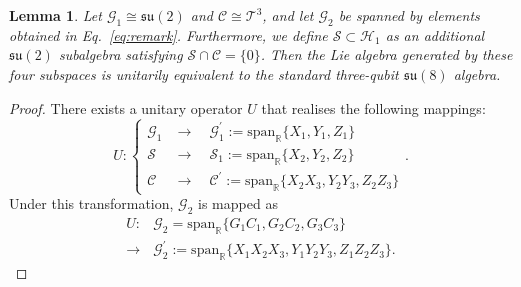 \documentclass[aps,showpacs,amsmath,amssymb,twocolumn,prx,longbibliography,superscriptaddress,notitlepage,floatfix,10pt]{revtex4-2}
\newtheorem{lemma}{Lemma} %
\begin{document}
\begin{lemma}
Let $\mathcal{G}_{1}\cong\mathfrak{su}(2)$ and 
$\mathcal{C}\cong\mathcal{T}^3$, and let $\mathcal{G}_{2}$ be spanned by elements obtained in Eq.~\eqref{eq:remark}. 
Furthermore, we define $\mathcal{S}\subset\mathcal{H}_{1}$ as an additional 
$\mathfrak{su}(2)$ subalgebra satisfying $\mathcal{S}\cap\mathcal{C}=\{0\}$.
Then the Lie algebra generated by these four subspaces is unitarily equivalent to the standard three-qubit $\mathfrak{su}(8)$ algebra.
\label{lemma:22}
\end{lemma}
\begin{proof}
There exists a unitary operator $U$ that realises the following mappings:
\begin{equation}
U:\begin{cases}
    \mathcal{G}_{1}&\rightarrow    \quad\mathcal{G}_{1}^{\prime}:=\mathrm{span}_{\mathbb{R}}\bigl\{X_{1},Y_{1},Z_{1}\bigr\}    \\
    \mathcal{S}&\rightarrow\quad\mathcal{S}_{1}:=    \mathrm{span}_{\mathbb{R}}\bigl\{
    X_{2},Y_{2},Z_{2}\bigr\}    \\
    \mathcal{C}&\rightarrow \quad\mathcal{C}^{\prime}:=    \mathrm{span}_{\mathbb{R}}\bigl\{
    X_{2}X_{3},Y_{2}Y_{3},Z_{2}Z_{3}\bigr\}
\end{cases} .       
\label{eq:UF}
\end{equation}
Under this transformation, $\mathcal G_{2}$ is mapped as
\begin{equation}
\begin{split}
    U:&\mathcal{G}_{2}=\mathrm{span}_{\mathbb{R}}\{G_{1}C_{1},G_{2}C_{2},G_{3}C_{3}\}\\
    \rightarrow&\mathcal{G}_{2}^{\prime}:=\mathrm{span}_{\mathbb{R}}\{X_{1}X_{2}X_{3},Y_{1}Y_{2}Y_{3},Z_{1}Z_{2}Z_{3}\}.
\end{split}
\end{equation}


\end{proof}
\end{document}
